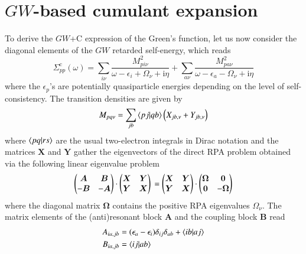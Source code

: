 \documentclass[aip,jcp,reprint,noshowkeys,superscriptaddress]{revtex4-2}
\newcommand{\co}{\text{c}}
\newcommand{\bO}{\boldsymbol{0}}
\newcommand{\bA}{\boldsymbol{A}}
\newcommand{\bB}{\boldsymbol{B}}
\newcommand{\bX}{\boldsymbol{X}}
\newcommand{\bY}{\boldsymbol{Y}}
\newcommand{\bOm}{\boldsymbol{\Omega}}
\newcommand{\eps}{\epsilon}
\newcommand{\Om}{\Omega}
\newcommand{\Sig}{\Sigma}
\newcommand{\ii}{\mathrm{i}}
\begin{document}
\section{$GW$-based cumulant expansion}
\label{sec:GWC}
To derive the $GW$+C expression of the Green's function, let us now consider the diagonal elements of the $GW$ retarded self-energy, which reads
\begin{equation} \label{eq:SigC}
	\Sig_{pp}^\co(\omega) 
	= \sum_{i\nu} \frac{M_{pi\nu}^2}{\omega - \eps_i + \Om_\nu + \ii \eta} 
	+ \sum_{a\nu} \frac{M_{pa\nu}^2}{\omega - \eps_a - \Om_\nu + \ii \eta} 
\end{equation}
where the $\eps_p$'s are potentially quasiparticle energies depending on the level of self-consistency. 
The transition densities are given by
\begin{equation}
	\label{eq:sERI}
	M_{pq\nu} = \sum_{jb} \braket{pj}{qb} \qty(X_{jb,\nu} + Y_{jb,\nu})
\end{equation}
where $\braket{pq}{rs}$ are the usual two-electron integrals in Dirac notation and the matrices $\bX$ and $\bY$ gather the eigenvectors of the direct RPA problem \cite{SchuckBook,Chen_2017,Ren_2015} obtained via the following linear eigenvalue problem
\begin{equation}
\label{eq:RPA}
	\begin{pmatrix} 
    	\bA & \bB
		\\
    	-\bB & -\bA
	\end{pmatrix}
	\cdot
	\begin{pmatrix} 
    	\bX & \bY 
		\\
    	\bY & \bX 
    \end{pmatrix}
  	\\
	=
	\begin{pmatrix} 
    	\bX & \bY
		\\
    	\bY & \bX
    \end{pmatrix}
	\cdot
	\begin{pmatrix} 
    	\bOm & \bO
		\\
    	\bO & -\bOm
    \end{pmatrix}  
\end{equation}
where the diagonal matrix $\bOm$ contains the positive RPA eigenvalues $\Om_\nu$.
The matrix elements of the (anti)resonant block $\bA$ and the coupling block $\bB$ read 
\begin{subequations}
\begin{align}
	\label{eq:A}
    A_{ia,jb} & = (\eps_{a}-\eps_{i}) \delta_{ij}\delta_{ab} + \braket{ib}{aj} 
    \\
	\label{eq:B}
    B_{ia,jb} & =  \braket{ij}{ab}
\end{align}
\end{subequations}
\end{document}
